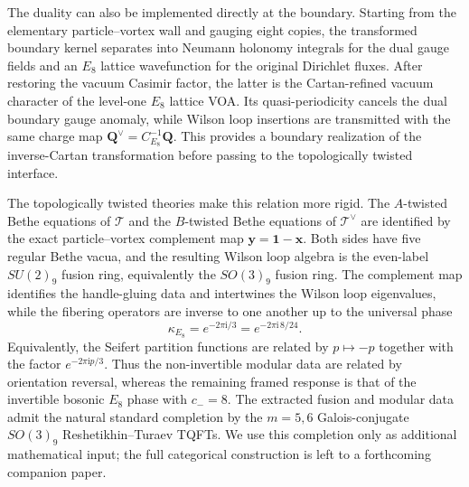 \documentclass[11pt,a4paper]{article}
\numberwithin{equation}{section}
\begin{document}
The duality can also be implemented directly at the boundary.  Starting from the elementary particle--vortex wall and gauging eight copies, the transformed boundary kernel separates into Neumann holonomy integrals for the dual gauge fields and an $E_8$ lattice wavefunction for the original Dirichlet fluxes.  After restoring the vacuum Casimir factor, the latter is the Cartan-refined vacuum character of the level-one $E_8$ lattice VOA.  Its quasi-periodicity cancels the dual boundary gauge anomaly, while Wilson loop insertions are transmitted with the same charge map $\boldsymbol Q^\vee=C_{E_8}^{-1}\boldsymbol Q$.  This provides a boundary realization of the inverse-Cartan transformation before passing to the topologically twisted interface.

The topologically twisted theories make this relation more rigid.  The $A$-twisted Bethe equations of $\mathcal T$ and the $B$-twisted Bethe equations of $\mathcal T^\vee$ are identified by the exact particle--vortex complement map $\boldsymbol y=\boldsymbol 1-\boldsymbol x$.  Both sides have five regular Bethe vacua, and the resulting Wilson loop algebra is the even-label $SU(2)_9$ fusion ring, equivalently the $SO(3)_9$ fusion ring.  The complement map identifies the handle-gluing data and intertwines the Wilson loop eigenvalues, while the fibering operators are inverse to one another up to the universal phase
\begin{equation}
  \kappa_{E_8}=e^{-2\pi \mathrm{i}/3}=e^{-2\pi \mathrm{i}\,8/24}.
  \label{eq:summary-E8-framing}
\end{equation}
Equivalently, the Seifert partition functions are related by $p\mapsto -p$ together with the factor $e^{-2\pi \mathrm{i}p/3}$.  Thus the non-invertible modular data are related by orientation reversal, whereas the remaining framed response is that of the invertible bosonic $E_8$ phase with $c_-=8$.  The extracted fusion and modular data admit the natural standard completion by the $m=5,6$ Galois-conjugate $SO(3)_9$ Reshetikhin--Turaev TQFTs.  We use this completion only as additional mathematical input; the full categorical construction is left to a forthcoming companion paper.
\end{document}

